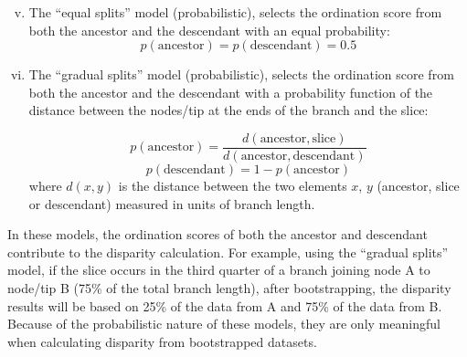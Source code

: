 \documentclass[12pt,a4paper]{article}
\begin{document}
\begin{enumerate}
    \begin{enumerate}[(i)]
    \setcounter{enumii}{4}
      \item The ``equal splits'' model (probabilistic), selects the ordination score from both the ancestor and the descendant with an equal probability:
          \begin{equation}
          p(\text{ancestor}) = p(\text{descendant}) = 0.5
          \end{equation}

    \item The ``gradual splits'' model (probabilistic), selects the ordination score from both the ancestor and the descendant with a probability function of the distance between the nodes/tip at the ends of the branch and the slice:

          \begin{equation}
              p(\text{ancestor}) = \frac{d(\text{ancestor},\text{slice})}{d(\text{ancestor},\text{descendant})}
          \end{equation}
          \begin{equation}
              p(\text{descendant}) = 1 - p(\text{ancestor})
          \end{equation}
    \noindent where $d(x,y)$ is the distance between the two elements $x$, $y$ (ancestor, slice or descendant) measured in units of branch length.
    \end{enumerate}

    In these models, the ordination scores of both the ancestor and descendant contribute to the disparity calculation.
    For example, using the ``gradual splits'' model, if the slice occurs in the third quarter of a branch joining node A to node/tip B (75\% of the total branch length), after bootstrapping, the disparity results will be based on 25\% of the data from A and 75\% of the data from B.
    Because of the probabilistic nature of these models, they are only meaningful when calculating disparity from bootstrapped datasets.
\end{enumerate}
\end{document}
